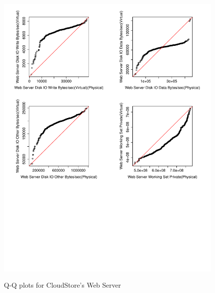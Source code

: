 \begin{figure}[tbh]
	\centering
	{\includegraphics[width=1.0\textwidth]{figures/appendix/qq_plots/CloudStore/Web_Server/Fourth_four.pdf}}
	\caption{Q-Q plots for CloudStore's Web Server}
\end{figure}

